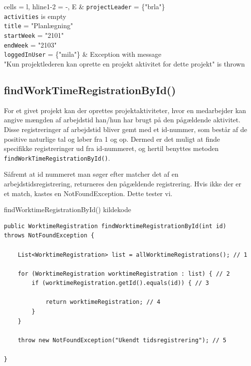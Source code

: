 \begin{table}[H]
\begin{tblr}{
  cells = {l},
  hline{1-2} = {-}{},
}
E & 
{
    \texttt{projectLeader} = \{"brla"\} \\
    \texttt{activities} is empty \\
    \texttt{title} = "Planlægning" \\
    \texttt{startWeek} = "2101" \\ 
    \texttt{endWeek} = "2103" \\
    \texttt{loggedInUser} = \{"mila"\}
} & 
{
    Exception with message \\ 
    "Kun projektlederen kan oprette en projekt aktivitet for dette projekt" is thrown
} \\

\end{tblr}
\end{table}

\subsection{findWorkTimeRegistrationById()} \label{sec:white_box_find_work_time}

For et givet projekt kan der oprettes projektaktiviteter, hvor en medarbejder kan angive mængden af arbejdstid han/hun har brugt på den pågældende aktivitet. Disse registreringer af arbejdstid bliver gemt med et id-nummer, som består af de positive naturlige tal og løber fra 1 og op. Dermed er det muligt at finde specifikke registreringer ud fra id-nummeret, og hertil benyttes metoden \texttt{findWorkTimeRegistrationById()}. 

Såfremt at id nummeret man søger efter matcher det af en arbejdstidsregistrering, returneres den pågældende registrering. Hvis ikke der er et match, kastes en NotFoundException. Dette tester vi.

\begin{listing}[H]
    \centering
    \caption{findWorktimeRegistrationById() kildekode}\label{lst:find_work_time_registration_by_id_source_code}
    \begin{verbatim}
public WorktimeRegistration findWorktimeRegistrationById(int id) throws NotFoundException {
    
    List<WorktimeRegistration> list = allWorktimeRegistrations(); // 1

    for (WorktimeRegistration worktimeRegistration : list) { // 2
        if (worktimeRegistration.getId().equals(id)) { // 3
            
            return worktimeRegistration; // 4
        }
    }

    throw new NotFoundException("Ukendt tidsregistrering"); // 5

}
    \end{verbatim}
\end{listing}

